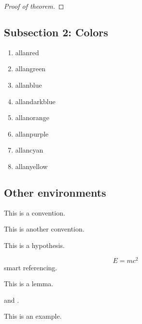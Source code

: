 \documentclass[UTF8, 12pt]{extarticle}
\begin{document}
\begin{proof}[Proof of theorem]
    \end{proof}

    \subsection{Subsection 2: Colors}
    \begin{enumerate}
        \item {\color{allanred}allanred}
        \item {\color{allangreen}allangreen}
        \item {\color{allanblue}allanblue}
        \item {\color{allandarkblue}allandarkblue}
        \item {\color{allanorange}allanorange}
        \item {\color{allanpurple}allanpurple}
        \item {\color{allancyan}allancyan}
        \item {\color{allanyellow}allanyellow}
    \end{enumerate}

    \subsection{Other environments}
    \begin{convention}[Convention]\label{convention}
        This is a convention.
    \end{convention}
    \begin{convention}\label{another convention}
        This is another convention.
    \end{convention}
    \begin{hypothesis}[Hypothesis]\label{hypothesis}
        This is a hypothesis.
    \end{hypothesis}
    \begin{equation}\label{eqn:big equation}
        E = mc^2
    \end{equation}
     smart referencing.
    \begin{lemma}\label{lemma}
        This is a lemma.
    \end{lemma}
     and .
    \begin{example}[Example]\label{example}
        This is an example.
    \end{example}
\end{document}
